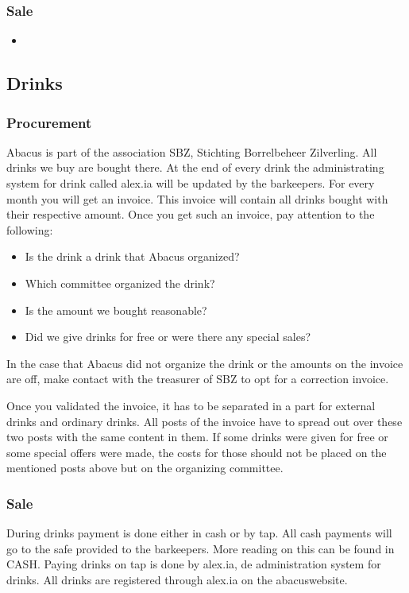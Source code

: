 \documentclass{report}
\begin{document}
\subsubsection{Sale}
\begin{itemize}
\vspace{-1mm}
\itemsep-1mm 
\item
\end{itemize}

\subsection{Drinks}
\subsubsection{Procurement}
Abacus is part of the association SBZ, Stichting Borrelbeheer Zilverling. All drinks we buy are bought there. At the end of every drink the administrating system for drink called alex.ia will be updated by the barkeepers. For every month you will get an invoice. This invoice will contain all drinks bought with their respective amount. Once you get such an invoice, pay attention to the following:  
\begin{itemize} 
\vspace{-1mm}
\itemsep-1mm 
\item Is the drink a drink that Abacus organized?
\item Which committee organized the drink?
\item Is the amount we bought reasonable?
\item Did we give drinks for free or were there any special sales?
\end{itemize}
In the case that Abacus did not organize the drink or the amounts on the invoice are off, make contact with the treasurer of SBZ to opt for a correction invoice.

Once you validated the invoice, it has to be separated in a part for external drinks and ordinary drinks. All posts of the invoice have to spread out over these two posts with the same content in them. If some drinks were given for free or some special offers were made, the costs for those should not be placed on the mentioned posts above but on the organizing committee.  

\subsubsection{Sale}
During drinks payment is done either in cash or by tap. All cash payments will go to the safe provided to the barkeepers. More reading on this can be found in CASH. Paying drinks on tap is done by alex.ia, de administration system for drinks. All drinks are registered through alex.ia on the abacuswebsite.  
\end{document}
